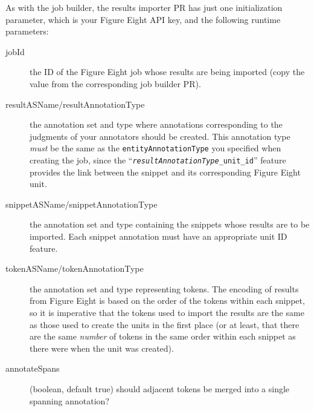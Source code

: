 As with the job builder, the results importer PR has just one initialization
parameter, which is your Figure Eight API key, and the following runtime
parameters:
\begin{description}
\item[jobId] the ID of the Figure Eight job whose results are being imported
  (copy the value from the corresponding job builder PR).
\item[resultASName/resultAnnotationType] the annotation set and type where
  annotations corresponding to the judgments of your annotators should be
  created.  This annotation type \emph{must} be the same as the
  \verb!entityAnnotationType! you specified when creating the job, since the
  ``\texttt{\emph{resultAnnotationType}\_unit\_id}'' feature provides the link
  between the snippet and its corresponding Figure Eight unit.
\item[snippetASName/snippetAnnotationType] the annotation set and type
  containing the snippets whose results are to be imported.  Each snippet
  annotation must have an appropriate unit ID feature.
\item[tokenASName/tokenAnnotationType] the annotation set and type representing
  tokens.  The encoding of results from Figure Eight is based on the order of
  the tokens within each snippet, so it is imperative that the tokens used to
  import the results are the same as those used to create the units in the
  first place (or at least, that there are the same \emph{number} of tokens
  in the same order within each snippet as there were when the unit was
  created).
\item[annotateSpans] (boolean, default true) should adjacent tokens be merged
  into a single spanning annotation?
\end{description}

